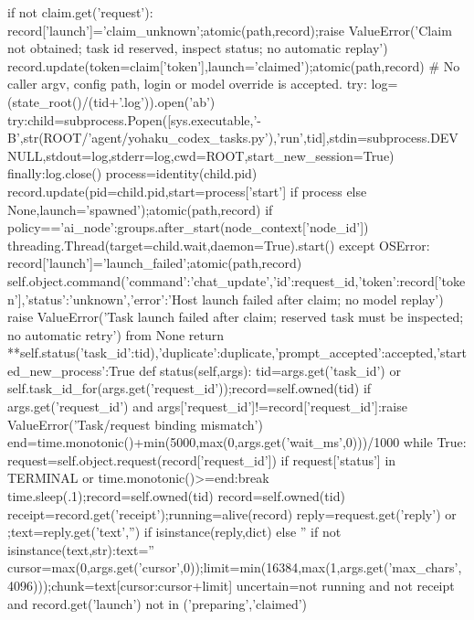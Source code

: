             if not claim.get('request'):
                record['launch']='claim_unknown';atomic(path,record);raise ValueError('Claim not obtained; task id reserved, inspect status; no automatic replay')
            record.update(token=claim['token'],launch='claimed');atomic(path,record)
            # No caller argv, config path, login or model override is accepted.
            try:
                log=(state_root()/(tid+'.log')).open('ab')
                try:child=subprocess.Popen([sys.executable,'-B',str(ROOT/'agent/yohaku_codex_tasks.py'),'run',tid],stdin=subprocess.DEVNULL,stdout=log,stderr=log,cwd=ROOT,start_new_session=True)
                finally:log.close()
                process=identity(child.pid)
                record.update(pid=child.pid,start=process['start'] if process else None,launch='spawned');atomic(path,record)
                if policy=='ai_node':groups.after_start(node_context['node_id'])
                threading.Thread(target=child.wait,daemon=True).start()
            except OSError:
                record['launch']='launch_failed';atomic(path,record)
                self.object.command({'command':'chat_update','id':request_id,'token':record['token'],'status':'unknown','error':'Host launch failed after claim; no model replay'})
                raise ValueError('Task launch failed after claim; reserved task must be inspected; no automatic retry') from None
        return {**self.status({'task_id':tid}),'duplicate':duplicate,'prompt_accepted':accepted,'started_new_process':True}
    def status(self,args):
        tid=args.get('task_id') or self.task_id_for(args.get('request_id'));record=self.owned(tid)
        if args.get('request_id') and args['request_id']!=record['request_id']:raise ValueError('Task/request binding mismatch')
        end=time.monotonic()+min(5000,max(0,args.get('wait_ms',0)))/1000
        while True:
            request=self.object.request(record['request_id'])
            if request['status'] in TERMINAL or time.monotonic()>=end:break
            time.sleep(.1);record=self.owned(tid)
        record=self.owned(tid)
        receipt=record.get('receipt');running=alive(record)
        reply=request.get('reply') or {};text=reply.get('text','') if isinstance(reply,dict) else ''
        if not isinstance(text,str):text=''
        cursor=max(0,args.get('cursor',0));limit=min(16384,max(1,args.get('max_chars',4096)));chunk=text[cursor:cursor+limit]
        uncertain=not running and not receipt and record.get('launch') not in ('preparing','claimed')
